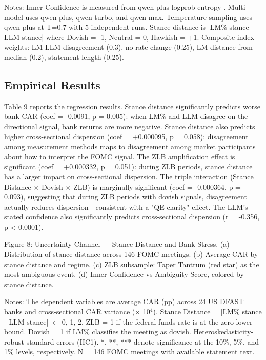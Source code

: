 \documentclass[12pt,a4paper]{article}
\begin{document}
Notes: Inner Confidence is measured from qwen-plus logprob entropy \citep{Chen2025}. Multi-model uses qwen-plus, qwen-turbo, and qwen-max. Temperature sampling uses qwen-plus at T=0.7 with 5 independent runs. Stance distance is |LM\% stance - LLM stance| where Dovish = -1, Neutral = 0, Hawkish = +1. Composite index weights: LM-LLM disagreement (0.3), no rate change (0.25), LM distance from median (0.2), statement length (0.25).

\subsection{Empirical Results}

Table 9 reports the regression results. Stance distance significantly predicts worse bank CAR (coef = -0.0091, p = 0.005): when LM\% and LLM disagree on the directional signal, bank returns are more negative. Stance distance also predicts higher cross-sectional dispersion (coef = +0.000095, p = 0.058): disagreement among measurement methods maps to disagreement among market participants about how to interpret the FOMC signal. The ZLB amplification effect is significant (coef = +0.000332, p = 0.051): during ZLB periods, stance distance has a larger impact on cross-sectional dispersion. The triple interaction (Stance Distance $\times$  Dovish $\times$  ZLB) is marginally significant (coef = -0.000364, p = 0.093), suggesting that during ZLB periods with dovish signals, disagreement actually reduces dispersion—consistent with a "QE clarity" effect. The LLM's stated confidence also significantly predicts cross-sectional dispersion (r = -0.356, p < 0.0001).

Figure 8: Uncertainty Channel — Stance Distance and Bank Stress. (a) Distribution of stance distance across 146 FOMC meetings. (b) Average CAR by stance distance and regime. (c) ZLB subsample: Taper Tantrum (red star) as the most ambiguous event. (d) Inner Confidence vs Ambiguity Score, colored by stance distance.

\begin{table}[H]
\centering
\caption{Stance Distance and Bank Cumulative Abnormal Returns}
\label{tab:stance_regression}
\end{table}

Notes: The dependent variables are average CAR (pp) across 24 US DFAST banks and cross-sectional CAR variance ($\times$ 10$^{4}$). Stance Distance = |LM\% stance - LLM stance| $\in$ {0, 1, 2}. ZLB = 1 if the federal funds rate is at the zero lower bound. Dovish = 1 if LM\% classifies the meeting as dovish. Heteroskedasticity-robust standard errors (HC1). *, **, *** denote significance at the 10\%, 5\%, and 1\% levels, respectively. N = 146 FOMC meetings with available statement text.
\end{document}
